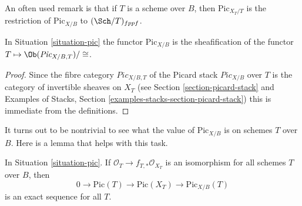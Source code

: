 \medskip\noindent
An often used remark is that if $T$ is a scheme over $B$, then
$\text{Pic}_{X_T/T}$ is the restriction of $\text{Pic}_{X/B}$ to
$(\Sch/T)_{fppf}$.

\begin{lemma}
\label{lemma-pic-over-pic}
In Situation \ref{situation-pic}
the functor $\text{Pic}_{X/B}$ is the sheafification of
the functor $T \mapsto \Ob(\textit{Pic}_{X/B, T})/\cong$.
\end{lemma}

\begin{proof}
Since the fibre category $\textit{Pic}_{X/B, T}$ of the Picard stack
$\textit{Pic}_{X/B}$ over $T$ is the category of invertible sheaves on
$X_T$ (see Section \ref{section-picard-stack} and
Examples of Stacks, Section \ref{examples-stacks-section-picard-stack})
this is immediate from the definitions.
\end{proof}

\noindent
It turns out to be nontrivial to see what the value of $\text{Pic}_{X/B}$
is on schemes $T$ over $B$. Here is a lemma that helps with this task.

\begin{lemma}
\label{lemma-flat-geometrically-connected-fibres}
In Situation \ref{situation-pic}.
If $\mathcal{O}_T \to f_{T, *}\mathcal{O}_{X_T}$ is an isomorphism
for all schemes $T$ over $B$, then
$$
0 \to \text{Pic}(T) \to \text{Pic}(X_T) \to \text{Pic}_{X/B}(T)
$$
is an exact sequence for all $T$.
\end{lemma}


